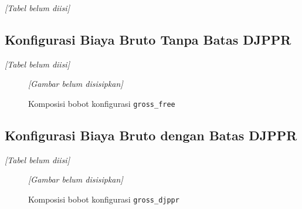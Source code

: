         \begin{table}[H]
            \centering
            \caption{Ringkasan biaya, CCaR, $J_{\text{MCCaR}}$, dan penghematan terhadap eksisting dan baseline (bank latih)}\label{tab:results summary}
            \textit{[Tabel belum diisi]}
        \end{table}

        \subsection{Konfigurasi Biaya Bruto Tanpa Batas DJPPR}\label{subsec:gross free}

        \begin{table}[H]
            \centering
            \caption{Komposisi optimal konfigurasi \texttt{gross\_free} dibandingkan eksisting 2024}\label{tab:composition gross free}
            \textit{[Tabel belum diisi]}
        \end{table}

        \begin{figure}[H]
            \centering
            \textit{[Gambar belum disisipkan]}
            \caption{Komposisi bobot konfigurasi \texttt{gross\_free}}\label{fig:composition gross free}
        \end{figure}

        \subsection{Konfigurasi Biaya Bruto dengan Batas DJPPR}\label{subsec:gross djppr}

        \begin{table}[H]
            \centering
            \caption{Komposisi optimal konfigurasi \texttt{gross\_djppr} dibandingkan eksisting 2024}\label{tab:composition gross djppr}
            \textit{[Tabel belum diisi]}
        \end{table}

        \begin{figure}[H]
            \centering
            \textit{[Gambar belum disisipkan]}
            \caption{Komposisi bobot konfigurasi \texttt{gross\_djppr}}\label{fig:composition gross djppr}
        \end{figure}

